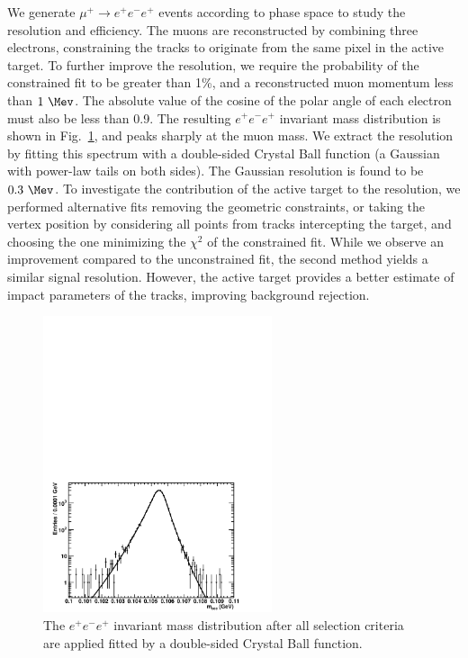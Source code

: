 We generate $\mu^+ \rightarrow e^+e^-e^+$ events according to phase space to study the resolution and efficiency. The muons are reconstructed by combining three electrons, constraining the tracks to originate from the same pixel in the active target. To further improve the resolution, we require the probability of the constrained fit to be greater than 1\%, and a reconstructed muon momentum less than $1 ~\Mev$. The absolute value of the cosine of the polar angle of each electron must also be less than 0.9. The resulting $e^+e^-e^+$ invariant mass distribution is shown in Fig.~\ref{Fig::mu3e2}, and peaks sharply at the muon mass. We extract the resolution by fitting this spectrum with a double-sided Crystal Ball function (a Gaussian with power-law tails on both sides). The Gaussian resolution is found to be $0.3~\Mev$. To investigate the contribution of the active target to the resolution, we performed alternative fits removing the geometric constraints, or taking the vertex position by considering all points from tracks intercepting the target, and choosing the one minimizing the $\chi^2$ of the constrained fit. While we observe an improvement compared to the unconstrained fit, the second method yields a similar signal resolution. However, the active target provides a better estimate of impact parameters of the tracks, improving background rejection.

\begin{figure}[htb]
\begin{center}
\includegraphics[width=0.6\textwidth]{Figures/mu3e-resoFit.pdf}
\end{center}
\caption{The $e^+e^-e^+$ invariant mass distribution after all selection criteria are applied fitted by a double-sided Crystal Ball function.}
\label{Fig::mu3e2}
\end{figure}

